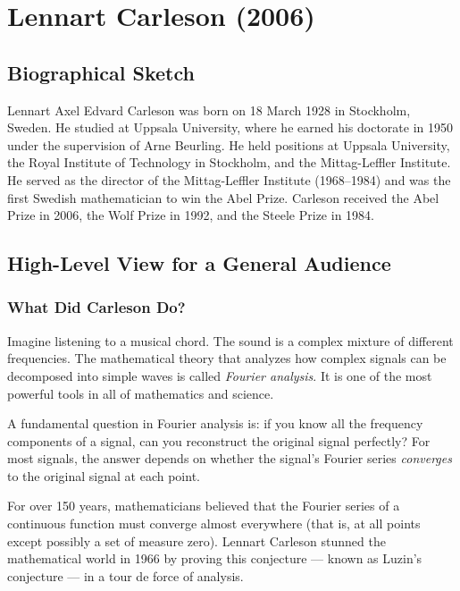 \chapter{Lennart Carleson (2006)}

\section{Biographical Sketch}



Lennart Axel Edvard Carleson was born on 18 March 1928 in Stockholm, Sweden. He studied at Uppsala University, where he earned his doctorate in 1950 under the supervision of Arne Beurling. He held positions at Uppsala University, the Royal Institute of Technology in Stockholm, and the Mittag-Leffler Institute. He served as the director of the Mittag-Leffler Institute (1968--1984) and was the first Swedish mathematician to win the Abel Prize. Carleson received the Abel Prize in 2006, the Wolf Prize in 1992, and the Steele Prize in 1984.

\section{High-Level View for a General Audience}

\subsection{What Did Carleson Do?}

Imagine listening to a musical chord. The sound is a complex mixture of different frequencies. The mathematical theory that analyzes how complex signals can be decomposed into simple waves is called \emph{Fourier analysis}. It is one of the most powerful tools in all of mathematics and science.

A fundamental question in Fourier analysis is: if you know all the frequency components of a signal, can you reconstruct the original signal perfectly? For most signals, the answer depends on whether the signal's Fourier series \emph{converges} to the original signal at each point.

For over 150 years, mathematicians believed that the Fourier series of a continuous function must converge almost everywhere (that is, at all points except possibly a set of measure zero). Lennart Carleson stunned the mathematical world in 1966 by proving this conjecture --- known as Luzin's conjecture --- in a tour de force of analysis.

